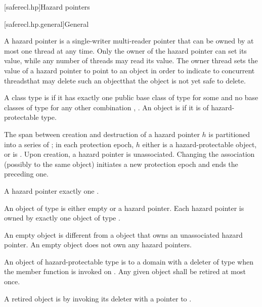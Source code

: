 
[saferecl.hp]{Hazard pointers}

[saferecl.hp.general]{General}

A hazard pointer is a single-writer multi-reader pointer that can be owned by at most one thread at any time. Only the owner of the hazard pointer can set its value, while any number of threads may read its value. The owner thread sets the value of a hazard pointer to point to an object in order to indicate to concurrent threads\textemdash that may delete such an object\textemdash that the object is not yet safe to delete.

A class type  is  if it has exactly one public base class of type  for some  and no base classes of type  for any other combination , . An object is  if it is of hazard-protectable type.

The span between creation and destruction of a hazard pointer $h$ is partitioned into a series of ; in each protection epoch, $h$ either is  a hazard-protectable object, or is . Upon creation, a hazard pointer is unassociated. Changing the association (possibly to the same object) initiates a new protection epoch and ends the preceding one.

A hazard pointer  exactly one . 

An object of type  is either empty or  a hazard pointer. Each hazard pointer is owned by exactly one object of type . \begin{note} An empty  object is different from a  object that owns an unassociated hazard pointer. An empty  object does not own any hazard pointers.\end{note}

An object  of hazard-protectable type  is  to a domain with a deleter of type  when the member function  is invoked on . Any given object  shall be retired at most once.

A retired object  is  by invoking its deleter with a pointer to .

